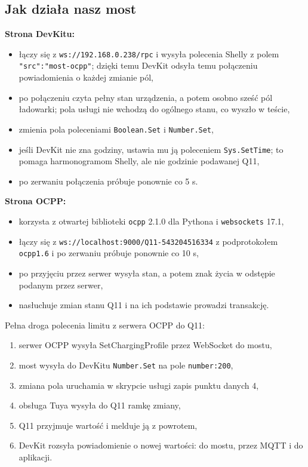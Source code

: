 \documentclass[11pt,a4paper]{article}
\begin{document}
\subsection{Jak działa nasz most}

\textbf{Strona DevKitu:}

\begin{itemize}
\item łączy się z \texttt{ws:\allowbreak{}/\allowbreak{}/\allowbreak{}192.\allowbreak{}168.\allowbreak{}0.\allowbreak{}238/\allowbreak{}rpc} i wysyła polecenia Shelly z polem \texttt{"src":\allowbreak{}"most-\allowbreak{}ocpp"}; dzięki temu DevKit odsyła temu połączeniu powiadomienia o każdej zmianie pól,
\item po połączeniu czyta pełny stan urządzenia, a potem osobno sześć pól ładowarki; pola usługi nie wchodzą do ogólnego stanu, co wyszło w teście,
\item zmienia pola poleceniami \texttt{Boolean.Set} i \texttt{Number.Set},
\item jeśli DevKit nie zna godziny, ustawia mu ją poleceniem \texttt{Sys.SetTime}; to pomaga harmonogramom Shelly, ale nie godzinie podawanej Q11,
\item po zerwaniu połączenia próbuje ponownie co 5 s.
\end{itemize}

\textbf{Strona OCPP:}

\begin{itemize}
\item korzysta z otwartej biblioteki \texttt{ocpp} 2.1.0 dla Pythona i \texttt{websockets} 17.1,
\item łączy się z \texttt{ws:\allowbreak{}/\allowbreak{}/\allowbreak{}localhost:\allowbreak{}9000/\allowbreak{}Q11-\allowbreak{}543204516334} z podprotokołem \texttt{ocpp1.6} i po zerwaniu próbuje ponownie co 10 s,
\item po przyjęciu przez serwer wysyła stan, a potem znak życia w odstępie podanym przez serwer,
\item nasłuchuje zmian stanu Q11 i na ich podstawie prowadzi transakcję.
\end{itemize}

Pełna droga polecenia limitu z serwera OCPP do Q11:

\begin{enumerate}
\item serwer OCPP wysyła SetChargingProfile przez WebSocket do mostu,
\item most wysyła do DevKitu \texttt{Number.Set} na pole \texttt{number:200},
\item zmiana pola uruchamia w skrypcie usługi zapis punktu danych 4,
\item obsługa Tuya wysyła do Q11 ramkę zmiany,
\item Q11 przyjmuje wartość i melduje ją z powrotem,
\item DevKit rozsyła powiadomienie o nowej wartości: do mostu, przez MQTT i do aplikacji.
\end{enumerate}
\end{document}
